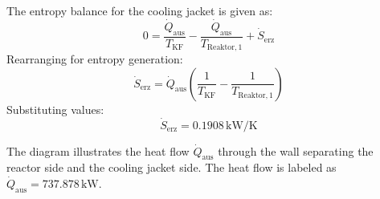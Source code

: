 The entropy balance for the cooling jacket is given as:  
\[
0 = \frac{\dot{Q}_{\text{aus}}}{T_{\text{KF}}} - \frac{\dot{Q}_{\text{aus}}}{T_{\text{Reaktor},1}} + \dot{S}_{\text{erz}}
\]  
Rearranging for entropy generation:  
\[
\dot{S}_{\text{erz}} = \dot{Q}_{\text{aus}} \left( \frac{1}{T_{\text{KF}}} - \frac{1}{T_{\text{Reaktor},1}} \right)
\]  
Substituting values:  
\[
\dot{S}_{\text{erz}} = 0.1908 \, \text{kW/K}
\]  

The diagram illustrates the heat flow \( \dot{Q}_{\text{aus}} \) through the wall separating the reactor side and the cooling jacket side. The heat flow is labeled as \( \dot{Q}_{\text{aus}} = 737.878 \, \text{kW} \).
